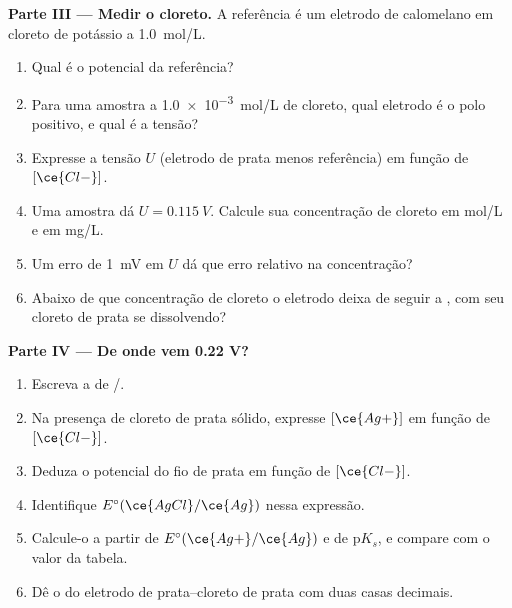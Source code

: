 \begin{problem}
\medskip
\noindent\textbf{Parte III --- Medir o cloreto.}
A referência é um eletrodo de calomelano em cloreto de potássio a
\qty{1.0}{mol/L}.
\begin{enumerate}[resume]
  \item Qual é o potencial da referência?
  \item Para uma amostra a \qty{1.0e-3}{mol/L} de cloreto, qual eletrodo
        é o polo positivo, e qual é a tensão?
  \item Expresse a tensão $U$ (eletrodo de prata menos referência) em
        função de $[\ce{Cl-}]$.
  \item Uma amostra dá $U = \qty{0.115}{V}$. Calcule sua concentração de
        cloreto em \unit{mol/L} e em \unit{mg/L}.
  \item Um erro de \qty{1}{mV} em $U$ dá que erro relativo na
        concentração?
  \item Abaixo de que concentração de cloreto o eletrodo deixa de seguir
        a , com seu cloreto de prata se dissolvendo?
\end{enumerate}

\medskip
\noindent\textbf{Parte IV --- De onde vem 0.22 V?}
\begin{enumerate}[resume]
  \item Escreva a  de /.
  \item Na presença de cloreto de prata sólido, expresse $[\ce{Ag+}]$ em
        função de $[\ce{Cl-}]$.
  \item Deduza o potencial do fio de prata em função de $[\ce{Cl-}]$.
  \item Identifique $E^\circ(\ce{AgCl}/\ce{Ag})$ nessa expressão.
  \item Calcule-o a partir de $E^\circ(\ce{Ag+}/\ce{Ag})$ e de
        $\mathrm{p}K_s$, e compare com o valor da tabela.
  \item Dê o  do eletrodo de prata--cloreto de prata com
        duas casas decimais.
\end{enumerate}
\end{problem}

